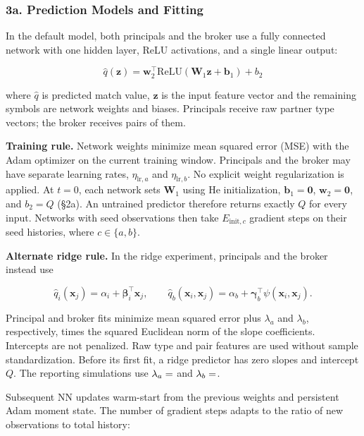 \documentclass[11pt]{article}
\begin{document}
\subsubsection{3a. Prediction Models and Fitting}\label{a.-architecture-and-fitting}

In the default model, both principals and the broker use a fully connected network with one hidden layer, ReLU activations, and a single linear output:

\[\hat{q}(\mathbf{z}) = \mathbf{w}_2^\top \text{ReLU}(\mathbf{W}_1 \mathbf{z} + \mathbf{b}_1) + b_2\]

where \(\hat q\) is predicted match value, \(\mathbf{z}\) is the input feature vector and the remaining symbols are network weights and biases. Principals receive raw partner type vectors; the broker receives pairs of them.

\textbf{Training rule.} Network weights minimize mean squared error (MSE) with the Adam optimizer on the current training window. Principals and the broker may have separate learning rates, \(\eta_{\mathrm{lr},a}\) and \(\eta_{\mathrm{lr},b}\). No explicit weight regularization is applied. At \(t = 0\), each network sets \(\mathbf W_1\) using He initialization, \(\mathbf b_1=\mathbf 0\), \(\mathbf w_2=\mathbf 0\), and \(b_2=Q\) (§2a). An untrained predictor therefore returns exactly \(Q\) for every input. Networks with seed observations then take \(E_{\mathrm{init},c}\) gradient steps on their seed histories, where \(c\in\{a,b\}\).

\textbf{Alternate ridge rule.} In the ridge experiment, principals and the broker instead use

\[
\hat q_i(\mathbf x_j)=\alpha_i+\boldsymbol\beta_i^\top\mathbf x_j,
\qquad
\hat q_b(\mathbf x_i,\mathbf x_j)=\alpha_b+\boldsymbol\gamma_b^\top\psi(\mathbf x_i,\mathbf x_j).
\]

Principal and broker fits minimize mean squared error plus \(\lambda_a\) and \(\lambda_b\), respectively, times the squared Euclidean norm of the slope coefficients. Intercepts are not penalized. Raw type and pair features are used without sample standardization. Before its first fit, a ridge predictor has zero slopes and intercept \(Q\). The reporting simulations use \(\lambda_a=\pv{settingridge_lambda_agent}\) and \(\lambda_b=\pv{settingridge_lambda_broker}\).

Subsequent NN updates warm-start from the previous weights and persistent Adam moment state. The number of gradient steps adapts to the ratio of new observations to total history:
\end{document}
